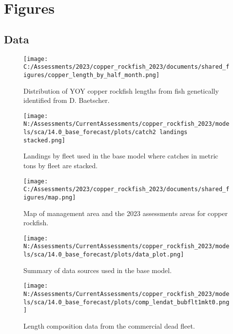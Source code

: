 \documentclass[11pt,
  english,
  letterpaper,
]{article}
\begin{document}
\newpage

\clearpage


\hypertarget{figures}{%
\section{Figures}\label{figures}}

\hypertarget{data-1}{%
\subsection{Data}\label{data-1}}

\begin{figure}
\centering
\texttt{[image: C:/Assessments/2023/copper\_rockfish\_2023/documents/shared\_figures/copper\_length\_by\_half\_month.png]}
\caption{Distribution of YOY copper rockfish lengths from fish genetically identified from D. Baetscher.\label{fig:copper-smurf-length}}
\end{figure}

\pagebreak

\begin{figure}
\centering
\texttt{[image: N:/Assessments/CurrentAssessments/copper\_rockfish\_2023/models/sca/14.0\_base\_forecast/plots/catch2 landings stacked.png]}
\caption{Landings by fleet used in the base model where catches in metric tons by fleet are stacked.\label{fig:catch}}
\end{figure}

\pagebreak

\begin{figure}
\centering
\texttt{[image: C:/Assessments/2023/copper\_rockfish\_2023/documents/shared\_figures/map.png]}
\caption{Map of management area and the 2023 assessments areas for copper rockfish.\label{fig:ca-map}}
\end{figure}

\pagebreak

\begin{figure}
\centering
\texttt{[image: N:/Assessments/CurrentAssessments/copper\_rockfish\_2023/models/sca/14.0\_base\_forecast/plots/data\_plot.png]}
\caption{Summary of data sources used in the base model.\label{fig:data-plot}}
\end{figure}

\pagebreak

\begin{figure}
\centering
\texttt{[image: N:/Assessments/CurrentAssessments/copper\_rockfish\_2023/models/sca/14.0\_base\_forecast/plots/comp\_lendat\_bubflt1mkt0.png]}
\caption{Length composition data from the commercial dead fleet.\label{fig:com-dead-len-data}}
\end{figure}
\end{document}
